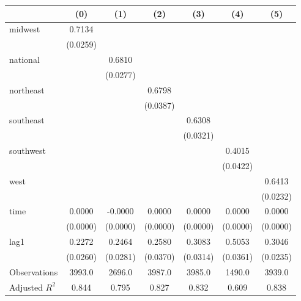 \begin{tabular}{lcccccc}
\toprule
 & (0) & (1) & (2) & (3) & (4) & (5) \\
\midrule
midwest & 0.7134 &  &  &  &  &  \\
\vspace{0.2cm}
 & (0.0259) &  &  &  &  &  \\
national &  & 0.6810 &  &  &  &  \\
\vspace{0.2cm}
 &  & (0.0277) &  &  &  &  \\
northeast &  &  & 0.6798 &  &  &  \\
\vspace{0.2cm}
 &  &  & (0.0387) &  &  &  \\
southeast &  &  &  & 0.6308 &  &  \\
\vspace{0.2cm}
 &  &  &  & (0.0321) &  &  \\
southwest &  &  &  &  & 0.4015 &  \\
\vspace{0.2cm}
 &  &  &  &  & (0.0422) &  \\
west &  &  &  &  &  & 0.6413 \\
\vspace{0.2cm}
 &  &  &  &  &  & (0.0232) \\
time & 0.0000 & -0.0000 & 0.0000 & 0.0000 & 0.0000 & 0.0000 \\
\vspace{0.2cm}
 & (0.0000) & (0.0000) & (0.0000) & (0.0000) & (0.0000) & (0.0000) \\
lag1 & 0.2272 & 0.2464 & 0.2580 & 0.3083 & 0.5053 & 0.3046 \\
\vspace{0.2cm}
 & (0.0260) & (0.0281) & (0.0370) & (0.0314) & (0.0361) & (0.0235) \\
\midrule
Observations & 3993.0 & 2696.0 & 3987.0 & 3985.0 & 1490.0 & 3939.0 \\
Adjusted $R^2$ & 0.844 & 0.795 & 0.827 & 0.832 & 0.609 & 0.838 \\
\bottomrule
\end{tabular}
